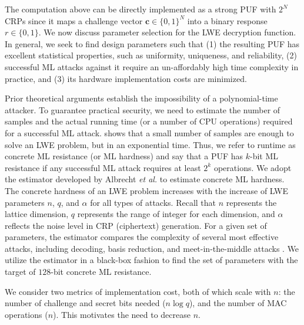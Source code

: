 The computation above can be directly implemented as a strong PUF with $2^N$ CRPs since it maps a challenge vector $\mathbf{c}\in \{0,1\}^N$ into a binary response $r\in\{0,1\}$.
We now discuss parameter selection for the LWE decryption function. 
In general, we seek to find design parameters such that 
(1) the resulting PUF has excellent statistical properties, such as uniformity, uniqueness, and reliability, 
(2) successful ML attacks against it require an un-affordably high time complexity in practice, and 
(3) its hardware implementation costs are minimized. 

Prior theoretical arguments establish the impossibility of a polynomial-time attacker. 
To guarantee practical security, we need to estimate the number of samples and the actual running time (or a number of CPU operations) required for a successful ML attack. \cite{regev2009lattices} shows that a small number of samples are enough to solve an LWE problem, but in an exponential time. 
Thus, we refer to runtime as concrete ML resistance (or ML hardness) and say that a PUF has $k$-bit ML resistance if any successful ML attack requires at least $2^k$ operations. 
We adopt the estimator developed by Albrecht \emph{et al.} \cite{albrecht2015concrete} to estimate concrete ML hardness. 
The concrete hardness of an LWE problem increases with the increase of LWE parameters $n$, $q$, and $\alpha$ for all types of attacks.
Recall that $n$ represents the lattice dimension, $q$ represents the range of integer for each dimension, and $\alpha$ reflects the noise level in CRP (ciphertext) generation.
For a given set of parameters, the estimator compares the complexity of several most effective attacks, including decoding, basis reduction, and meet-in-the-middle attacks %
\cite{howgrave2007hybrid,lindner2011better}. 
We utilize the estimator in a black-box fashion to find the set of parameters with the target of $128$-bit concrete ML resistance. 

We consider two metrics of implementation cost, both of which scale with $n$: the number of challenge and secret bits needed ($n\log q$), and the number of MAC operations ($n$).
This motivates the need to decrease $n$.

